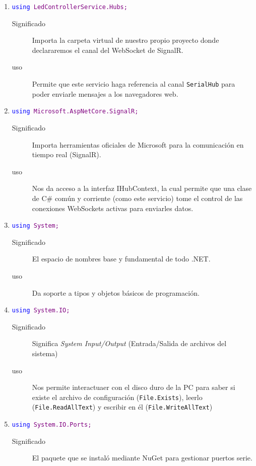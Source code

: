 \documentclass[
10pt, %
a4paper, %
oneside, %
headinclude,footinclude, %
BCOR5mm, %
]{scrartcl}
\begin{document}
\begin{enumerate}
	\item \texttt{\textcolor{blue}{using} \textcolor{purple}{LedControllerService.Hubs;}}
	\begin{description}
		\item[Significado] Importa la carpeta virtual de nuestro propio proyecto donde declararemos el canal del WebSocket de SignalR.
		\item[uso] Permite que este servicio haga referencia al canal \texttt{SerialHub} para poder enviarle mensajes a los navegadores web.
	\end{description}
	\item \texttt{\textcolor{blue}{using} \textcolor{purple}{Microsoft.AspNetCore.SignalR;}}
	\begin{description}
		\item[Significado] Importa herramientas oficiales de Microsoft para la comunicación en tiempo real (SignalR).
		\item[uso] Nos da acceso a la interfaz IHubContext, la cual permite que una clase de C\# común y corriente (como este servicio) tome el control de las conexiones WebSockets activas para enviarles datos.
	\end{description}
	\item \texttt{\textcolor{blue}{using} \textcolor{purple}{System;}}
	\begin{description}
		\item[Significado] El espacio de nombres base y fundamental de todo .NET.
		\item[uso] Da soporte a tipos y objetos básicos de programación.
	\end{description}
	\item \texttt{\textcolor{blue}{using} \textcolor{purple}{System.IO;}}
	\begin{description}
		\item[Significado] Significa \textit{System Input/Output} (Entrada/Salida de archivos del sistema)
		\item[uso] Nos permite interactuaer con el disco duro de la PC para saber si existe el archivo de configuración (\texttt{File.Exists}), leerlo (\texttt{File.ReadAllText}) y escribir en él (\texttt{File.WriteAllText})
	\end{description}
	\item \texttt{\textcolor{blue}{using} \textcolor{purple}{System.IO.Ports;}}
	\begin{description}
		\item[Significado] El paquete que se instaló mediante NuGet para gestionar puertos serie.

\end{description}
\end{enumerate}
\end{document}
